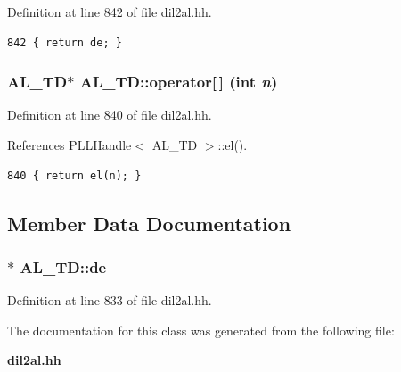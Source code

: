 Definition at line 842 of file dil2al.hh.



\footnotesize\begin{verbatim}842 { return de; }
\end{verbatim}\normalsize 
{}
\subsubsection{\setlength{\rightskip}{0pt plus 5cm}AL\_\-TD$\ast$ AL\_\-TD::operator[$\,$] (int {\em n})\hspace{0.3cm}{\tt  [inline]}}\label{classAL__TD_a2}




Definition at line 840 of file dil2al.hh.

References PLLHandle$<$ AL\_\-TD $>$::el().



\footnotesize\begin{verbatim}840 { return el(n); }
\end{verbatim}\normalsize 


\subsection{Member Data Documentation}
\subsubsection{$\ast$ AL\_\-TD::de\hspace{0.3cm}{\tt  [protected]}}\label{classAL__TD_n0}




Definition at line 833 of file dil2al.hh.

The documentation for this class was generated from the following file:\begin{CompactItemize}
\item 
{\bf dil2al.hh}\end{CompactItemize}
